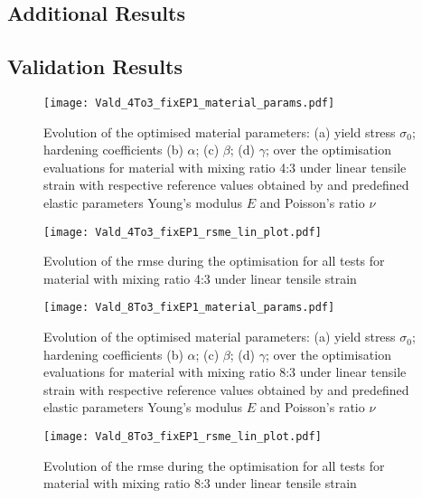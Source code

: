 \begin{appendices}
    \chapter{Additional Results} \label{app:additionalResults}
    \section{Validation Results} \label{app:verifResults}

    \begin{figure}[H]
    \centering
    \texttt{[image: Vald\_4To3\_fixEP1\_material\_params.pdf]}
    \caption{Evolution of the optimised material parameters: (a) yield stress $\sigma_0$; hardening coefficients (b) $\alpha$; (c) $\beta$; (d) $\gamma$; over the optimisation evaluations for material with mixing ratio 4:3 under linear tensile strain with respective reference values obtained by \citet{ries_deciphering_nodate} and predefined elastic parameters Young's modulus $E$ and Poisson's ratio $\nu$}
    \label{fig:material_params_4to3}
    \end{figure}

    \begin{figure}[H]
    \centering
    \texttt{[image: Vald\_4To3\_fixEP1\_rsme\_lin\_plot.pdf]}
    \caption{Evolution of the \acrfull{rmse} during the optimisation for all tests for material with mixing ratio 4:3 under linear tensile strain}
    \label{fig:verfifRMSE43}
    \end{figure}

    \begin{figure}[H]
    \centering
    \texttt{[image: Vald\_8To3\_fixEP1\_material\_params.pdf]}
    \caption{Evolution of the optimised material parameters: (a) yield stress $\sigma_0$; hardening coefficients (b) $\alpha$; (c) $\beta$; (d) $\gamma$; over the optimisation evaluations for material with mixing ratio 8:3 under linear tensile strain with respective reference values obtained by \citet{ries_deciphering_nodate} and predefined elastic parameters Young's modulus $E$ and Poisson's ratio $\nu$}
    \label{fig:material_params_8to3}
    \end{figure}

    \begin{figure}[H]
    \centering
    \texttt{[image: Vald\_8To3\_fixEP1\_rsme\_lin\_plot.pdf]}
    \caption{Evolution of the \acrfull{rmse} during the optimisation for all tests for material with mixing ratio 8:3 under linear tensile strain}
    \label{fig:verfifRMSE83}
    \end{figure}



\end{appendices}
